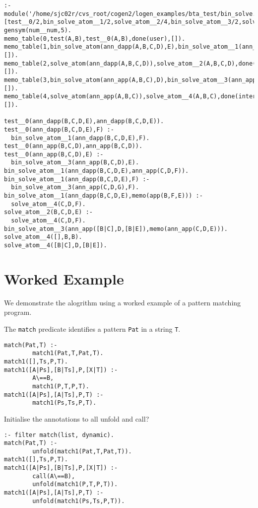\documentclass[12pt,twoside]{article}
\begin{document}
\begin{verbatim}
:- module('/home/sjc02r/cvs_root/cogen2/logen_examples/bta_test/bin_solve.pl.memo',[test__0/2,bin_solve_atom__1/2,solve_atom__2/4,bin_solve_atom__3/2,solve_atom__4/3]).
gensym(num__num,5).
memo_table(0,test(A,B),test__0(A,B),done(user),[]).
memo_table(1,bin_solve_atom(ann_dapp(A,B,C,D),E),bin_solve_atom__1(ann_dapp(A,B,C,D),E),done(internal),[]).
memo_table(2,solve_atom(ann_dapp(A,B,C,D)),solve_atom__2(A,B,C,D),done(internal),[]).
memo_table(3,bin_solve_atom(ann_app(A,B,C),D),bin_solve_atom__3(ann_app(A,B,C),D),done(internal),[]).
memo_table(4,solve_atom(ann_app(A,B,C)),solve_atom__4(A,B,C),done(internal),[]).

test__0(ann_dapp(B,C,D,E),ann_dapp(B,C,D,E)).
test__0(ann_dapp(B,C,D,E),F) :- 
  bin_solve_atom__1(ann_dapp(B,C,D,E),F).
test__0(ann_app(B,C,D),ann_app(B,C,D)).
test__0(ann_app(B,C,D),E) :- 
  bin_solve_atom__3(ann_app(B,C,D),E).
bin_solve_atom__1(ann_dapp(B,C,D,E),ann_app(C,D,F)).
bin_solve_atom__1(ann_dapp(B,C,D,E),F) :- 
  bin_solve_atom__3(ann_app(C,D,G),F).
bin_solve_atom__1(ann_dapp(B,C,D,E),memo(app(B,F,E))) :- 
  solve_atom__4(C,D,F).
solve_atom__2(B,C,D,E) :- 
  solve_atom__4(C,D,F).
bin_solve_atom__3(ann_app([B|C],D,[B|E]),memo(ann_app(C,D,E))).
solve_atom__4([],B,B).
solve_atom__4([B|C],D,[B|E]).
\end{verbatim}


\section{Worked Example}
We demonstrate the alogrithm using a worked example of a pattern matching program.

The {\tt match} predicate identifies a pattern {\tt Pat} in a string {\tt T}.
\begin{verbatim}
match(Pat,T) :-
        match1(Pat,T,Pat,T).
match1([],Ts,P,T).
match1([A|Ps],[B|Ts],P,[X|T]) :-
        A\==B,
        match1(P,T,P,T).
match1([A|Ps],[A|Ts],P,T) :-
        match1(Ps,Ts,P,T).
\end{verbatim}

Initialise the annotations to all unfold and call?
\begin{verbatim}
:- filter match(list, dynamic).
match(Pat,T) :-
        unfold(match1(Pat,T,Pat,T)).
match1([],Ts,P,T).
match1([A|Ps],[B|Ts],P,[X|T]) :-
        call(A\==B),
        unfold(match1(P,T,P,T)).
match1([A|Ps],[A|Ts],P,T) :-
        unfold(match1(Ps,Ts,P,T)).
\end{verbatim}
\end{document}
